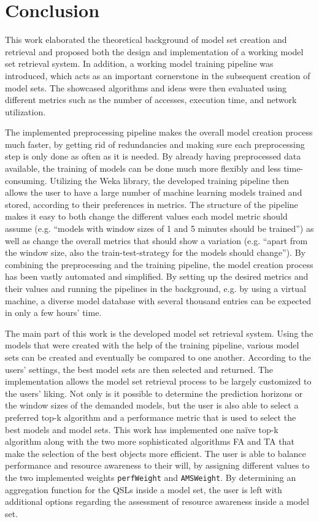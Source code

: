 \section{Conclusion}

This work elaborated the theoretical background of model set creation and retrieval and proposed both the design and implementation of a working model set retrieval system. In addition, a working model training pipeline was introduced, which acts as an important cornerstone in the subsequent creation of model sets. The showcased algorithms and ideas were then evaluated using different metrics such as the number of accesses, execution time, and network utilization.

The implemented preprocessing pipeline makes the overall model creation process much faster, by getting rid of redundancies and making sure each preprocessing step is only done as often as it is needed. By already having preprocessed data available, the training of models can be done much more flexibly and less time-consuming. Utilizing the Weka library, the developed training pipeline then allows the user to have a large number of machine learning models trained and stored, according to their preferences in metrics. The structure of the pipeline makes it easy to both change the different values each model metric should assume (e.g. “models with window sizes of 1 and 5 minutes should be trained”) as well as change the overall metrics that should show a variation (e.g. “apart from the window size, also the train-test-strategy for the models should change”). By combining the preprocessing and the training pipeline, the model creation process has been vastly automated and simplified. By setting up the desired metrics and their values and running the pipelines in the background, e.g. by using a virtual machine, a diverse model database with several thousand entries can be expected in only a few hours’ time.

The main part of this work is the developed model set retrieval system. Using the models that were created with the help of the training pipeline, various model sets can be created and eventually be compared to one another. According to the users’ settings, the best model sets are then selected and returned. The implementation allows the model set retrieval process to be largely customized to the users’ liking. Not only is it possible to determine the prediction horizons or the window sizes of the demanded models, but the user is also able to select a preferred top-k algorithm and a performance metric that is used to select the best models and model sets. This work has implemented one naïve top-k algorithm along with the two more sophisticated algorithms FA and TA that make the selection of the best objects more efficient. The user is able to balance performance and resource awareness to their will, by assigning different values to the two implemented weights \texttt{perfWeight} and \texttt{AMSWeight}. By determining an aggregation function for the QSLs inside a model set, the user is left with additional options regarding the assessment of resource awareness inside a model set.


